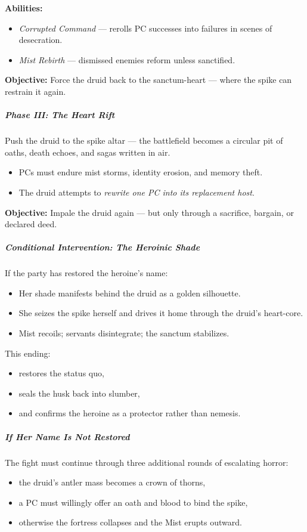 \documentclass[11pt]{article}
\begin{document}
\noindent
\textbf{Abilities:}
\begin{itemize}
  \item \emph{Corrupted Command} --- rerolls PC successes into failures in scenes of desecration.
  \item \emph{Mist Rebirth} --- dismissed enemies reform unless sanctified.
\end{itemize}

\noindent
\textbf{Objective:} Force the druid back to the sanctum-heart --- where the spike can restrain it again.

\subparagraph{Phase III: The Heart Rift}
Push the druid to the spike altar --- the battlefield becomes a circular pit of oaths, death echoes, and sagas written in air.

\begin{itemize}
  \item PCs must endure mist storms, identity erosion, and memory theft.
  \item The druid attempts to \emph{rewrite one PC into its replacement host}.
\end{itemize}

\noindent
\textbf{Objective:} Impale the druid again --- but only through a sacrifice, bargain, or declared deed.

\subparagraph{Conditional Intervention: The Heroinic Shade}
If the party has restored the heroine's name:
\begin{itemize}
  \item Her shade manifests behind the druid as a golden silhouette.
  \item She seizes the spike herself and drives it home through the druid's heart-core.
  \item Mist recoils; servants disintegrate; the sanctum stabilizes.
\end{itemize}

\noindent
This ending:
\begin{itemize}
  \item restores the status quo,
  \item seals the husk back into slumber,
  \item and confirms the heroine as a protector rather than nemesis.
\end{itemize}

\subparagraph{If Her Name Is Not Restored}
The fight must continue through three additional rounds of escalating horror:

\begin{itemize}
  \item the druid's antler mass becomes a crown of thorns,
  \item a PC must willingly offer an oath and blood to bind the spike,
  \item otherwise the fortress collapses and the Mist erupts outward.
\end{itemize}
\end{document}
